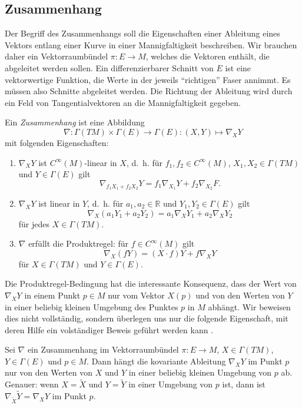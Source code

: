 \subsection{Zusammenhang}
Der Begriff des Zusammenhangs soll die Eigenschaften einer Ableitung 
eines Vektors entlang einer Kurve in einer Mannigfaltigkeit beschreiben.
Wir brauchen daher ein Vektorraumbündel $\pi\colon E\to M$, welches
die Vektoren enthält, die abgeleitet werden sollen.
Ein differenzierbarer Schnitt von $E$ ist eine vektorwertige
Funktion, die Werte in der jeweils ``richtigen'' Faser annimmt.
Es müssen also Schnitte abgeleitet werden.
Die Richtung der Ableitung wird durch ein Feld von Tangentialvektoren
an die Mannigfaltigkeit gegeben.

\begin{definition}
Ein \emph{Zusammenhang} ist eine Abbildung
%
\[
\nabla 
\colon
\Gamma(TM)\times \Gamma(E) \to \Gamma(E)
:
(X,Y) \mapsto \nabla_X Y
\]
mit folgenden Eigenschaften:
\begin{enumerate}
\item $\nabla_X Y$ ist $C^\infty(M)$-linear in $X$, d.~h. für 
$f_1,f_2\in C^{\infty}(M)$, $X_1,X_2\in \Gamma(TM)$ und $Y\in\Gamma(E)$ gilt
\[
\nabla_{f_1X_1+f_2X_2}Y
=
f_1\nabla_{X_1}Y + f_2\nabla_{X_2}F.
\]
\item $\nabla_X Y$ ist linear in $Y$, d.~h. für $a_1,a_2\in\mathbb{R}$
und $Y_1,Y_2\in \Gamma(E)$ gilt
\[
\nabla_X(a_1Y_1+a_2Y_2)
=
a_1\nabla_XY_1
+
a_2\nabla_XY_2
\]
für jedes $X\in\Gamma(TM)$.
\item
$\nabla$ erfüllt die Produktregel: für $f\in C^\infty(M)$ gilt
%
\[
\nabla_X (fY)
=
(X\cdot f)Y + f\nabla_X Y
\]
für $X\in\Gamma(TM)$ und $Y\in\Gamma(E)$.
\end{enumerate}
\end{definition}

Die Produktregel-Bedingung hat die interessante Konsequenz, dass der
Wert von $\nabla_XY$ in einem Punkt $p\in M$ nur vom Vektor $X(p)$ und
von den Werten von $Y$ in einer beliebig kleinen Umgebung des Punktes
$p$ in $M$ abhängt.
Wir beweisen dies nicht vollständig, sondern überlegen uns nur die
folgende Eigenschaft, mit deren Hilfe ein volständiger Beweis geführt
werden kann \cite[Proposition 4.5]{buch:leerm}.

\begin{lemma}
Sei $\nabla$ ein Zusammenhang im Vektorraumbündel $\pi\colon E\to M$,
$X\in \Gamma(TM)$, $Y\in \Gamma(E)$ und $p\in M$.
Dann hängt die kovariante Ableitung $\nabla_XY$ im Punkt $p$ nur von
den Werten von $X$ und $Y$ in einer beliebig kleinen Umgebung von $p$
ab.
Genauer: wenn $X=\tilde{X}$ und $Y=\tilde{Y}$ in einer Umgebung von
$p$ ist, dann ist $\nabla_{\tilde{X}}\tilde{Y} = \nabla_XY$ im Punkt $p$.
\end{lemma}

